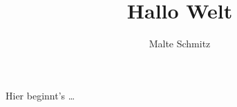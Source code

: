 \documentclass[paper=a6,pagesize=auto]{scrartcl}
\title{Hallo Welt}
\author{Malte Schmitz}
\begin{document}
  \maketitle
  Hier beginnt's \ldots
\end{document}
